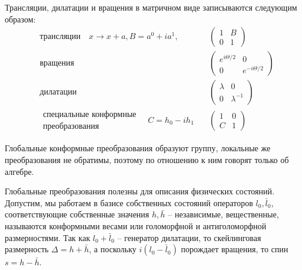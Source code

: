 \documentclass[a4paper,12pt]{article}
\theoremstyle{definition}
\theoremstyle{definition}
\theoremstyle{definition}
\begin{document}
Трансляции, дилатации и вращения в матричном виде записываются следующим образом:
\begin{eqnarray}
  \label{eq:233}
  &\mbox{трансляции} \quad x\to x+a, B=a^{0}+i a^{1},\quad &
  \begin{pmatrix}
    1 & B\\
    0 & 1
  \end{pmatrix}\\
  &\mbox{вращения}\quad &
  \begin{pmatrix}
    e^{i \Theta/2} & 0\\
    0 & e^{-i \Theta/2}
  \end{pmatrix}\\
  & \mbox{дилатации}\quad &
  \begin{pmatrix}
    \lambda & 0\\
    0 & \lambda^{-1}
  \end{pmatrix}\\
  &\begin{array}{r}
  \mbox{специальные конформные}    \\
  \mbox{преобразования}
  \end{array} 
  \quad
  C=h_{0}-i h_{1}\quad &
  \begin{pmatrix}
    1 & 0\\
    C & 1
  \end{pmatrix}
\end{eqnarray}

Глобальные конформные преобразования образуют группу, локальные же преобразования не обратимы, поэтому по отношению к ним говорят только об алгебре.

Глобальные преобразования полезны для описания физических состояний. Допустим, мы работаем в базисе собственных состояний операторов $l_{0}, \bar l_{0}$, соответствующие собственные значения $h,\bar h$ -- независимые, вещественные, называются конформными весами или голоморфной и антиголоморфной размерностями. Так как $l_{0}+\bar l_{0}$ -- генератор дилатации, то скейлинговая размерность $\Delta=h+\bar h$, а поскольку $i(l_{0}-\bar l_{0})$ порождает вращения, то спин $s=h-\bar h$.
\end{document}
